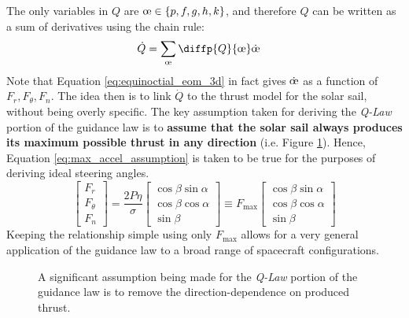 The only variables in $Q$ are $\moe \in \{p, f, g, h, k\}$, and therefore $Q$ can be written as a sum of derivatives using the chain rule:
\begin{align*}
  \dot{Q} & = \sum_{\moe} \diffp{Q}{{\moe}} \dot{\moe}
\end{align*}
Note that Equation \ref{eq:equinoctial_eom_3d} in fact gives $\dot{\moe}$ as a function of $F_r, F_\theta, F_n$. The idea then is to link $\dot{Q}$ to the thrust model for the solar sail, without being overly specific. The key assumption taken for deriving the \textit{\textit{Q-Law}} portion of the guidance law is to \textbf{assume that the solar sail always produces its maximum possible thrust in any direction} (i.e. Figure \ref{fig:thrust_curve}). Hence, Equation \ref{eq:max_accel_assumption} is taken to be true for the purposes of deriving ideal steering angles.
\begin{equation}
  \begin{bmatrix}
    F_r      \\
    F_\theta \\
    F_n
  \end{bmatrix} =
  \frac{2P\eta}{\sigma}
  \begin{bmatrix}
    \cos \beta \sin \alpha \\
    \cos \beta \cos \alpha \\
    \sin \beta
  \end{bmatrix}
  \equiv
  F_{\max}
  \begin{bmatrix}
    \cos \beta \sin \alpha \\
    \cos \beta \cos \alpha \\
    \sin \beta
  \end{bmatrix}
  \label{eq:max_accel_assumption}
\end{equation}
Keeping the relationship simple using only $F_{\max}$ allows for a very general application of the guidance law to a broad range of spacecraft configurations.

\begin{figure}
  \centering
  \caption{A significant assumption being made for the \textit{Q-Law} portion of the guidance law is to remove the direction-dependence on produced thrust.}
  \label{fig:thrust_curve}
\end{figure}

